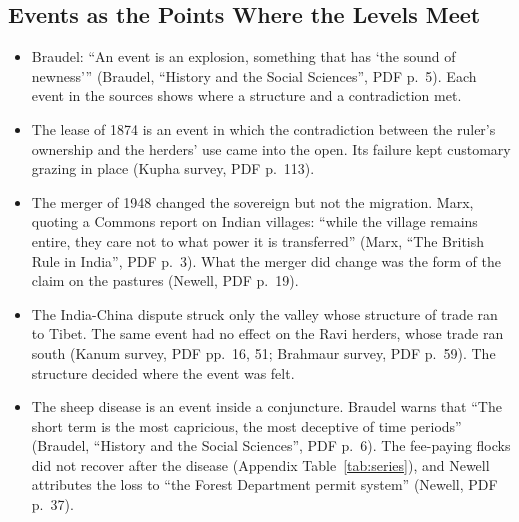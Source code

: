 \documentclass[11pt,a4paper]{article}
\newcommand{\cit}[1]{{\small(#1)}}
\newcommand{\Braudel}{Braudel, \enquote{History and the Social Sciences}}
\begin{document}
\subsection{Events as the Points Where the Levels Meet}
\begin{itemize}
\item Braudel: \enquote{An event is an explosion, something that has `the sound of
  newness'} \cit{\Braudel, PDF p.~5}. Each event in the sources shows where a
  structure and a contradiction met.
\item The lease of 1874 is an event in which the contradiction between the
  ruler's ownership and the herders' use came into the open. Its failure kept
  customary grazing in place \cit{Kupha survey, PDF p.~113}.
\item The merger of 1948 changed the sovereign but not the migration. Marx,
  quoting a Commons report on Indian villages: \enquote{while the village remains
  entire, they care not to what power it is transferred} \cit{Marx, \enquote{The
  British Rule in India}, PDF p.~3}. What the merger did change was the form of
  the claim on the pastures \cit{Newell, PDF p.~19}.
\item The India-China dispute struck only the valley whose structure of trade
  ran to Tibet. The same event had no effect on the Ravi herders, whose trade
  ran south \cit{Kanum survey, PDF pp.~16, 51; Brahmaur survey, PDF p.~59}.
  The structure decided where the event was felt.
\item The sheep disease is an event inside a conjuncture. Braudel warns that
  \enquote{The short term is the most capricious, the most deceptive of time
  periods} \cit{\Braudel, PDF p.~6}. The fee-paying flocks did not recover
  after the disease \cit{Appendix Table~\ref{tab:series}}, and Newell
  attributes the loss to \enquote{the Forest Department permit system}
  \cit{Newell, PDF p.~37}.
\end{itemize}
\end{document}
